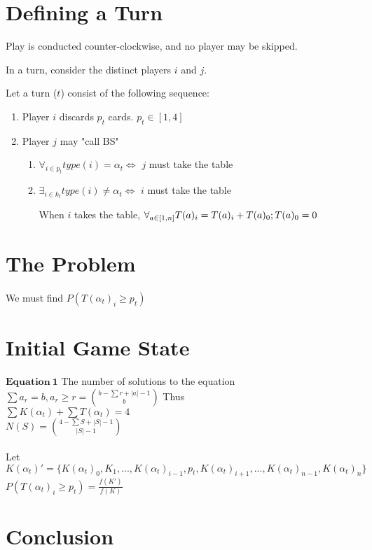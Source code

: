 \documentclass[a4paper,11pt]{article}
\begin{document}
\begin{description}
    \section{Defining a Turn}
    \item Play is conducted counter-clockwise, and no player may be skipped.
    \item In a turn, consider the distinct players $i$ and $j$.
    \item Let a turn ($t$) consist of the following sequence:
    \begin{enumerate}
        \item Player $i$ discards $p_t$ cards. $p_t \in [1,4]$
        \item Player $j$ may "call BS"
        \begin{enumerate}
            \item $\forall_{i\in p_t} type(i) = \alpha_t \iff $ $j$ must take the table
            \item $\exists_{i\in k_t} type(i) \neq \alpha_t \iff $ $i$ must take the table
            
            \subitem When $i$ takes the table, $\forall_{a \in [1, n]} \\ T(a)_i = T(a)_i + T(a)_0; T(a)_0 = 0$
        \end{enumerate}
    \end{enumerate}
    \section{The Problem}
    \paragraph{} We must find $P(T(\alpha_t)_{i} \geq p_t)$

\end{description}

\section{Initial Game State}
$\mathbf{Equation~1}$ The number of solutions to the equation $\sum {a_r} = b, a_r \geq r = {{b - \sum r + |a| - 1}\choose{b}}$
Thus \\
$\sum K(\alpha_t) + \sum T(\alpha_t) = 4$\\
$N(S) = {{4-\sum S + |S| - 1}\choose{|S|-1}}$\\
\\
Let $K(\alpha_t)' = \{K(\alpha_t)_0, K_1, ... , K(\alpha_t)_{i-1}, p_t, K(\alpha_t)_{i+1}, ... , K(\alpha_t)_{n-1}, K(\alpha_t)_{n}\}$ \\ 
$P(T(\alpha_t)_{i} \geq p_t) = \frac{f(K')}{f(K)}$
\section{Conclusion}
\end{document}
